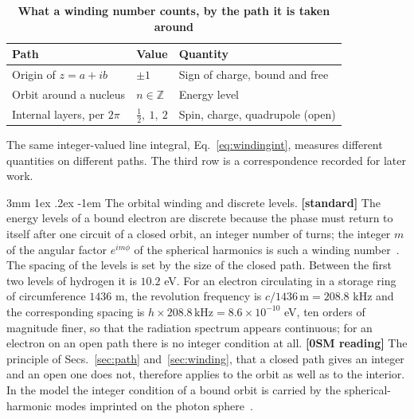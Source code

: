 \documentclass[%
 reprint, amsmath,amssymb, aps, prb, ]{revtex4-2}
\makeatletter
\numberwithin{equation}{section}
\renewcommand\paragraph{%
  \@startsection{paragraph}{4}{\z@}%
    {3mm \@plus 1ex \@minus .2ex}%
    {-1em}%
    {\normalfont\normalsize\itshape}}
\makeatother
\begin{document}
\begin{table}[t!]
\centering
\caption{\textbf{What a winding number counts, by the path it is taken around}}
\label{tab:windings}
\renewcommand{\arraystretch}{1.3}
\begin{tabular}{p{2.6cm}p{1.1cm}p{3.5cm}}
\toprule
\textbf{Path} & \textbf{Value} & \textbf{Quantity} \\
\midrule
\raggedright Origin of $z=a+ib$ & $\pm1$ & \raggedright Sign of charge, bound and free\tabularnewline
\addlinespace[0.15cm]
\raggedright Orbit around a nucleus & $n\in\mathbb{Z}$ & \raggedright Energy level\tabularnewline
\addlinespace[0.15cm]
\raggedright Internal layers, per $2\pi$ & $\tfrac12,\ 1,\ 2$ & \raggedright Spin, charge, quadrupole (open)\tabularnewline
\bottomrule
\end{tabular}
\vspace{0.2cm}
\begin{minipage}{0.95\columnwidth}
\justifying\footnotesize
The same integer-valued line integral, Eq.~\eqref{eq:windingint}, measures different quantities on different paths. The third row is a correspondence recorded for later work.
\end{minipage}
\end{table}

\paragraph{The orbital winding and discrete levels.} \textbf{[standard]} The energy levels of a bound electron are discrete because the phase must return to itself after one circuit of a closed orbit, an integer number of turns; the integer $m$ of the angular factor $e^{im\phi}$ of the spherical harmonics is such a winding number~\cite{ref:sakurai}. The spacing of the levels is set by the size of the closed path. Between the first two levels of hydrogen it is $10.2$ eV. For an electron circulating in a storage ring of circumference $1436$ m, the revolution frequency is $c/1436\,\mathrm{m}=208.8$ kHz and the corresponding spacing is $h\times208.8\,\mathrm{kHz}=8.6\times10^{-10}$ eV, ten orders of magnitude finer, so that the radiation spectrum appears continuous; for an electron on an open path there is no integer condition at all. \textbf{[0SM reading]} The principle of Secs.~\ref{sec:path} and~\ref{sec:winding}, that a closed path gives an integer and an open one does not, therefore applies to the orbit as well as to the interior. In the model the integer condition of a bound orbit is carried by the spherical-harmonic modes imprinted on the photon sphere~\cite{ref:p57}.
\end{document}
